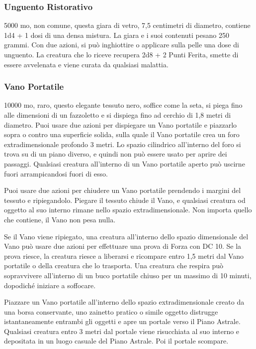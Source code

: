\begin{multicols}{2}
	\subsubsection*{Unguento Ristorativo}
	5000 mo, non comune, questa giara di vetro, 7,5 centimetri di diametro, contiene 1d4 + 1 dosi di una densa mistura. La giara e i suoi contenuti pesano 250 grammi. Con due azioni, si può inghiottire o applicare sulla pelle una dose di unguento. La creatura che lo riceve recupera 2d8 + 2 Punti Ferita, smette di essere avvelenata e viene curata da qualsiasi malattia.

	\subsubsection*{Vano Portatile}
	10000 mo, raro, questo elegante tessuto nero, soffice come la seta, si piega fino alle dimensioni di un fazzoletto e si dispiega fino ad cerchio di 1,8 metri di diametro. Puoi usare due azioni per dispiegare un Vano portatile e piazzarlo sopra o contro una superficie solida, sulla quale il Vano portatile crea un foro extradimensionale profondo 3 metri. Lo spazio cilindrico all'interno del foro si trova su di un piano diverso, e quindi non può essere usato per aprire dei passaggi. Qualsiasi creatura all'interno di un Vano portatile aperto può uscirne fuori arrampicandosi fuori di esso.

	Puoi usare due azioni per chiudere un Vano portatile prendendo i margini del tessuto e ripiegandolo. Piegare il tessuto chiude il Vano, e qualsiasi creatura od oggetto al suo interno rimane nello spazio extradimensionale. Non importa quello che contiene, il Vano non pesa nulla.

	Se il Vano viene ripiegato, una creatura all'interno dello spazio dimensionale del Vano può usare due azioni per effettuare una prova di Forza con DC 10. Se la prova riesce, la creatura riesce a liberarsi e ricompare entro 1,5 metri dal Vano portatile o della creatura che lo trasporta. Una creatura che respira può sopravvivere all'interno di un buco portatile chiuso per un massimo di 10 minuti, dopodiché iniziare a soffocare.

	Piazzare un Vano portatile all'interno dello spazio extradimensionale creato da una borsa conservante, uno zainetto pratico o simile oggetto distrugge istantaneamente entrambi gli oggetti e apre un portale verso il Piano Astrale. Qualsiasi creatura entro 3 metri dal portale viene risucchiata al suo interno e depositata in un luogo casuale del Piano Astrale. Poi il portale scompare.


\end{multicols}
